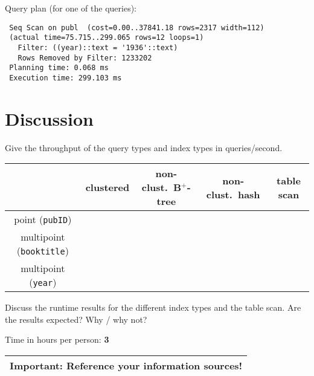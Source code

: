 \documentclass[11pt]{scrartcl}
\begin{document}
\smallskip\noindent
Query plan (for one of the queries):
{\small
\begin{verbatim}
 Seq Scan on publ  (cost=0.00..37841.18 rows=2317 width=112)
 (actual time=75.715..299.065 rows=12 loops=1)
   Filter: ((year)::text = '1936'::text)
   Rows Removed by Filter: 1233202
 Planning time: 0.068 ms
 Execution time: 299.103 ms
\end{verbatim}
}

\section{Discussion}

Give the throughput of the query types and index types in queries/second.
\begin{center}
  \begin{tabular}{c|c|c|c|c}
    & clustered & non-clust.\ B$^+$-tree & non-clust.\ hash & table scan \\
    \hline
    point ({\tt pubID}) & & & \\
    \hline
    multipoint ({\tt booktitle}) & & & \\
    \hline
    multipoint  ({\tt year}) & & & \\  
  \end{tabular}
\end{center}

\medskip

Discuss the runtime results for the different index types and the
table scan. Are the results expected? Why / why not?


\bigskip

\noindent Time in hours per person: {\bf 3}

\bigskip

\begin{center}
  \begin{tabular}{c}
    \hline
    {\bf Important:} Reference your information sources!
    \\\hline
  \end{tabular}
\end{center}
\end{document}
